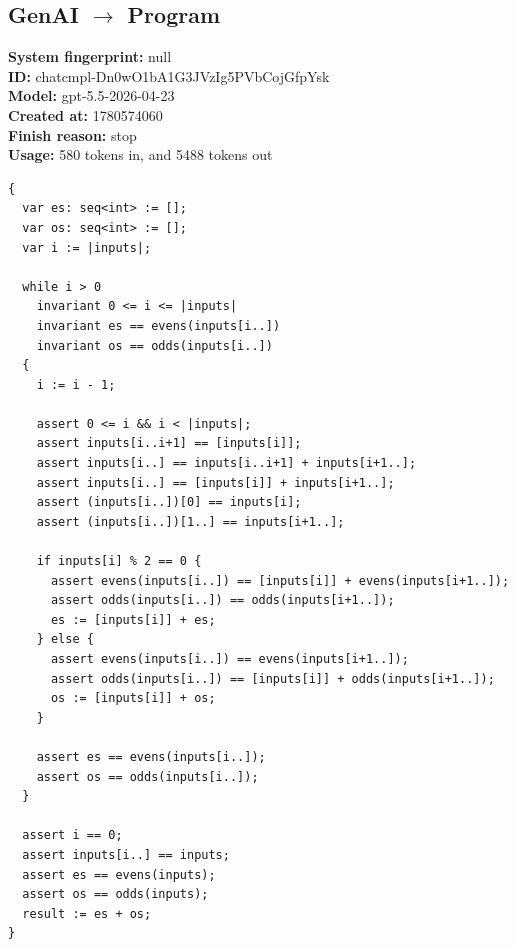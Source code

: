 \documentclass{article}
\begin{document}
\subsection*{GenAI $\rightarrow$ Program}
\textbf{System fingerprint: }null
\\\textbf{ID: }chatcmpl-Dn0wO1bA1G3JVzIg5PVbCojGfpYsk
\\\textbf{Model: }gpt-5.5-2026-04-23
\\\textbf{Created at: }1780574060
\\\textbf{Finish reason: }stop
\\\textbf{Usage: }580 tokens in, and 5488 tokens out
\begin{lstlisting}
{
  var es: seq<int> := [];
  var os: seq<int> := [];
  var i := |inputs|;

  while i > 0
    invariant 0 <= i <= |inputs|
    invariant es == evens(inputs[i..])
    invariant os == odds(inputs[i..])
  {
    i := i - 1;

    assert 0 <= i && i < |inputs|;
    assert inputs[i..i+1] == [inputs[i]];
    assert inputs[i..] == inputs[i..i+1] + inputs[i+1..];
    assert inputs[i..] == [inputs[i]] + inputs[i+1..];
    assert (inputs[i..])[0] == inputs[i];
    assert (inputs[i..])[1..] == inputs[i+1..];

    if inputs[i] % 2 == 0 {
      assert evens(inputs[i..]) == [inputs[i]] + evens(inputs[i+1..]);
      assert odds(inputs[i..]) == odds(inputs[i+1..]);
      es := [inputs[i]] + es;
    } else {
      assert evens(inputs[i..]) == evens(inputs[i+1..]);
      assert odds(inputs[i..]) == [inputs[i]] + odds(inputs[i+1..]);
      os := [inputs[i]] + os;
    }

    assert es == evens(inputs[i..]);
    assert os == odds(inputs[i..]);
  }

  assert i == 0;
  assert inputs[i..] == inputs;
  assert es == evens(inputs);
  assert os == odds(inputs);
  result := es + os;
}
\end{lstlisting}
\end{document}
